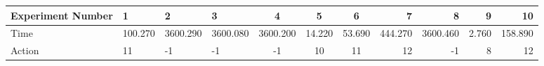\documentclass[8pt]{article}
\begin{document}
\begin{landscape}
\begin{tabular}{ | l | l | l | l | c | c | c | r | r | r | r | }
 \hline 
Experiment Number & 1 & 2 & 3 & 4 & 5 & 6 & 7 & 8 & 9 & 10\\ \hline
Time & 100.270 & 3600.290 & 3600.080 & 3600.200 & 14.220 & 53.690 & 444.270 & 3600.460 & 2.760 & 158.890\\ \hline
Action & 11 & -1 & -1 & -1 & 10 & 11 & 12 & -1 & 8 & 12\\ \hline\end{tabular}
\end{landscape}
\end{document}
